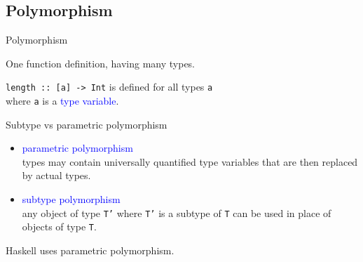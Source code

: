 \documentclass{beamer}
\def\code#1{\texttt{\frenchspacing#1}}
\begin{document}
\subsection{Polymorphism}

\begin{frame}[fragile]{Polymorphism}

\begin{block}{\centering One function definition, having many types.}
\end{block}

\pause

\vspace{1cm}
\code{length :: [a] -> Int} is defined for all types \code{a} \\
where \code{a} is a \textcolor{blue}{type variable}.

\end{frame}

\begin{frame}{Subtype vs parametric polymorphism}

\begin{itemize}
    \item \textcolor{blue}{parametric polymorphism} \\ types may contain universally quantified type variables that are then replaced by actual types.
    \item \textcolor{blue}{subtype polymorphism} \\ any object of type \code{T'} where \code{T'} is a subtype of \code{T} can be used in place of objects of type \code{T}.
\end{itemize}

\pause

\vspace{1cm}
Haskell uses parametric polymorphism.

\end{frame}
\end{document}
